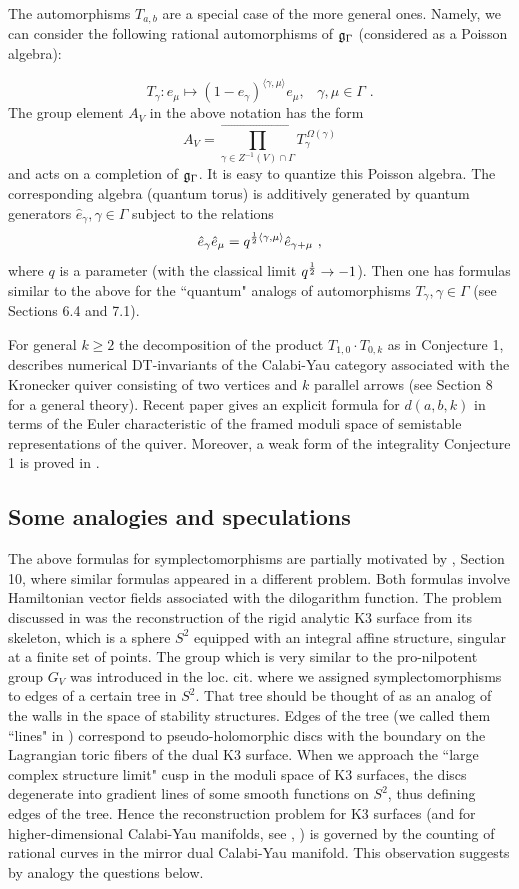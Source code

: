 \documentclass[12pt]{article}
\begin{document}
The automorphisms $T_{a,b}$ are  a special case of the more general ones.
Namely, we can consider the following rational automorphisms of ${\mathfrak g}_{\Gamma}$ (considered as a Poisson algebra):

$$ T_{\gamma}: e_{\mu}\mapsto (1-e_{\gamma})^{\langle \gamma, \mu\rangle}e_{\mu},\,\,\,\,\, \gamma,\mu \in \Gamma\,\,.$$
The group element $A_V$ in the above notation has the form
$$A_V=\prod_{\gamma\in Z^{-1}(V )\cap \Gamma}^{\longrightarrow} T_\gamma^{\,\Omega(\gamma)}$$
and acts on a completion of ${\mathfrak g}_\Gamma$. 
It is easy to quantize this Poisson algebra.
The corresponding algebra (quantum torus) is additively generated by quantum generators $\hat{e}_{\gamma}, \gamma\in \Gamma$ subject to the relations
$$\hat{e}_{\gamma}\hat{e}_{\mu}=q^{{1\over{2}}\langle \gamma,\mu\rangle}\hat{e}_{\gamma+\mu}\,\,,$$
where $q$ is a parameter (with the classical limit $q^{1\over{2}}\to -1 $). Then one has formulas similar to the above for the ``quantum"  analogs of automorphisms
$T_{\gamma}, \gamma \in \Gamma$ (see Sections 6.4 and 7.1).


 For general $k\ge 2$ the decomposition of the product $T_{1,0}\cdot T_{0,k}$ as in Conjecture 1, describes numerical DT-invariants
of the Calabi-Yau category associated with the Kronecker quiver consisting of two vertices and $k$ parallel arrows (see Section 8 for a general theory). 
 Recent paper \cite{Re1} gives an explicit formula for $d(a,b,k)$  in terms of the Euler characteristic of the framed moduli space of semistable representations of the quiver. Moreover, a weak form of the integrality Conjecture 1 is proved in \cite{Re1}.



\subsection{Some analogies and speculations}

The above formulas for symplectomorphisms are  partially motivated
by \cite{KoSo1}, Section 10, where similar formulas appeared in a different problem.
Both formulas involve  Hamiltonian vector fields associated with the dilogarithm function.
The problem discussed in \cite{KoSo1} was the reconstruction of the rigid analytic K3 surface from its skeleton,
which is a sphere $S^2$ equipped with an integral affine structure, singular at a finite set of points.
The group which is very similar to the pro-nilpotent group $G_V$ was introduced in the loc. cit.
where we assigned symplectomorphisms to edges of a certain tree in $S^2$.  That tree should be thought of as an analog of the walls in the space
of stability structures. Edges of the tree (we called them ``lines" in \cite{KoSo1}) correspond to pseudo-holomorphic
discs with the boundary on the Lagrangian toric fibers of the dual K3 surface. When we approach the ``large complex structure limit" cusp in the moduli space of K3 surfaces, the discs degenerate into  gradient lines of some smooth functions on $S^2$, thus defining edges of the tree.
Hence the reconstruction problem for K3 surfaces (and for higher-dimensional
Calabi-Yau manifolds, see \cite{GS1}, \cite{GS2}) is governed by the counting of rational curves in the mirror dual Calabi-Yau manifold.
This observation suggests by analogy the questions below.
\end{document}
